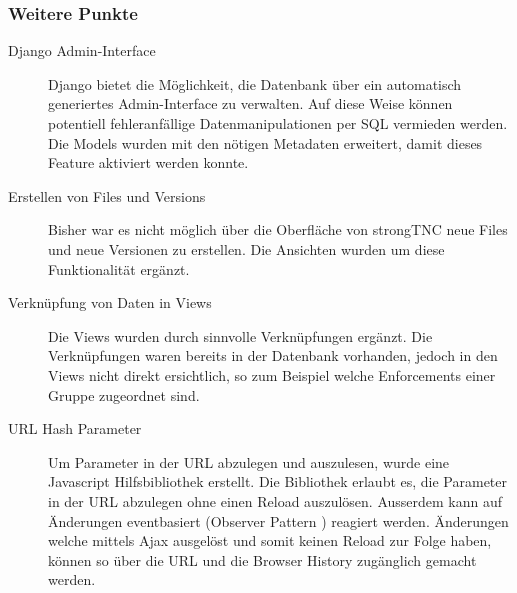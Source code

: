 \subsubsection{Weitere Punkte}
\begin{description}
\item[Django Admin-Interface] Django bietet die Möglichkeit, die Datenbank über
ein automatisch generiertes Admin-Interface zu verwalten. Auf diese Weise
können potentiell fehleranfällige Datenmanipulationen per SQL vermieden
werden. Die Models wurden mit den nötigen Metadaten erweitert, damit dieses
Feature aktiviert werden konnte.

\item[Erstellen von Files und Versions] Bisher war es nicht möglich über die
Oberfläche von strongTNC neue Files und neue Versionen zu erstellen. Die
Ansichten wurden um diese Funktionalität ergänzt.

\item[Verknüpfung von Daten in Views] Die Views wurden durch sinnvolle
Verknüpfungen ergänzt. Die  Verknüpfungen waren bereits in der Datenbank
vorhanden, jedoch in den Views nicht direkt ersichtlich, so zum Beispiel welche
Enforcements einer Gruppe zugeordnet sind.

\item[URL Hash Parameter] Um Parameter in der URL abzulegen und auszulesen,
wurde eine Javascript Hilfsbibliothek erstellt. Die Bibliothek erlaubt es, die
Parameter in der URL abzulegen ohne einen Reload auszulösen. Ausserdem kann auf
Änderungen eventbasiert (Observer Pattern \cite{gamma1994design}) reagiert werden.
Änderungen welche mittels Ajax ausgelöst und somit keinen Reload zur Folge
haben, können so über die URL und die Browser History zugänglich gemacht werden.
\end{description}




